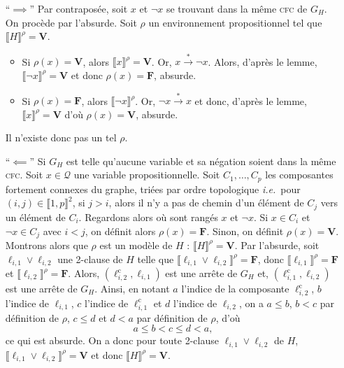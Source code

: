 \begin{prvk}
	\begin{prv}
		\begin{itemize}
			\item[``$\implies$''] Par contraposée, soit $x$ et $\lnot x$\/ se trouvant dans la même \textsc{cfc} de $G_H$. On procède par l'absurde. Soit $\rho$\/ un environnement propositionnel tel que $\llbracket H \rrbracket^\rho = \mathbf{V}$.
				\begin{itemize}
					\item  Si $\rho(x) = \mathbf{V}$, alors $\llbracket x \rrbracket^\rho = \mathbf{V}$. Or, $x \xrightarrow* \lnot x$. Alors, d'après le lemme, $\llbracket \lnot x \rrbracket^\rho = \mathbf{V}$\/ et donc $\rho(x) = \mathbf{F}$, absurde.
					\item Si $\rho(x) = \mathbf{F}$, alors $\llbracket \lnot x \rrbracket^\rho$. Or, $\lnot x\xrightarrow* x$\/ et donc, d'après le lemme, $\llbracket x \rrbracket^\rho = \mathbf{V}$\/ d'où $\rho(x) = \mathbf{V}$, absurde.
				\end{itemize}
				Il n'existe donc pas un tel $\rho$.
			\item[``$\impliedby$'']
				Si $G_H$\/ est telle qu'aucune variable et sa négation soient dans la même \textsc{cfc}. Soit $x \in \mathcal{Q}$\/ une variable propositionnelle. Soit $C_1,\ldots,C_p$\/ les composantes fortement connexes du graphe, triées par ordre topologique \textit{i.e.}\ pour  $(i,j) \in \llbracket 1,p \rrbracket^2$, si $j > i$, alors il n'y a pas de chemin d'un élément de $C_j$\/ vers un élément de $C_i$.
				Regardons alors où sont rangés $x$\/ et $\lnot x$. Si $x \in C_i$\/ et $\lnot x \in C_j$\/ avec $i < j$, on définit alors $\rho(x) = \mathbf{F}$. Sinon, on définit $\rho(x) = \mathbf{V}$.
				Montrons alors que $\rho$\/ est un modèle de $H$ : $\llbracket H \rrbracket^\rho = \mathbf{V}$.
				Par l'absurde, soit $\ell_{i,1} \lor \ell_{i,2}$\/ une 2-clause de $H$\/ telle que $\llbracket \ell_{i,1} \lor\ell_{i,2} \rrbracket^\rho = \mathbf{F}$, donc $\llbracket \ell_{i,1} \rrbracket^\rho = \mathbf{F}$\/ et $\llbracket \ell_{i,2} \rrbracket^\rho = \mathbf{F}$.
				Alors, $(\ell_{i,2}^\mathrm{c},\ell_{i,1})$\/ est une arrête de $G_H$ et, $(\ell_{i,1}^\mathrm{c},\ell_{i,2})$\/ est une arrête de $G_H$.
				Ainsi, en notant $a$\/ l'indice de la composante $\ell_{i,2}^\mathrm{c}$, $b$\/ l'indice de $\ell_{i,1}$, $c$\/ l'indice de $\ell_{i,1}^\mathrm{c}$\/ et $d$\/ l'indice de $\ell_{i,2}$, on a $a \le  b$, $b < c$\/ par définition de $\rho$, $c \le d$\/ et $d < a$\/ par définition de $\rho$, d'où \[
					a \le b < c \le d < a
				,\] ce qui est absurde.
				On a donc pour toute 2-clause $\ell_{i,1} \lor \ell_{i,2}$\/ de $H$, $\llbracket \ell_{i,1} \lor \ell_{i,2} \rrbracket^\rho = \mathbf{V}$\/ et donc $\llbracket H \rrbracket^\rho = \mathbf{V}$.
		\end{itemize}
	\end{prv}


\end{prvk}
